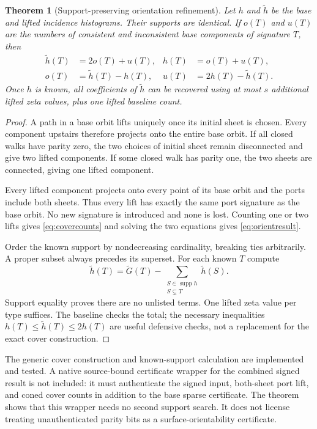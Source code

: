 \documentclass[11pt]{article}
\newtheorem{theorem}{Theorem}[section]
\theoremstyle{definition}
\newcommand{\supp}{\operatorname{supp}}
\begin{document}
\begin{theorem}[Support-preserving orientation refinement]
\label{thm:orientation}
Let $h$ and $\widetilde h$ be the base and lifted incidence histograms.
Their supports are identical. If $o(T)$ and $u(T)$ are the numbers of
consistent and inconsistent base components of signature $T$, then
\begin{align}
 \widetilde h(T)&=2o(T)+u(T),&h(T)&=o(T)+u(T),\label{eq:covercounts}\\
 o(T)&=\widetilde h(T)-h(T),&u(T)&=2h(T)-\widetilde h(T).\label{eq:orientresult}
\end{align}
Once $h$ is known, all coefficients of $\widetilde h$ can be recovered using
at most $s$ additional lifted zeta values, plus one lifted baseline count.
\end{theorem}
\begin{proof}
A path in a base orbit lifts uniquely once its initial sheet is chosen.
Every component upstairs therefore projects onto the entire base orbit.
If all closed walks have parity zero, the two choices of initial sheet
remain disconnected and give two lifted components. If some closed walk
has parity one, the two sheets are connected, giving one lifted component.

Every lifted component projects onto every point of its base orbit and the
ports include both sheets. Thus every lift has exactly the same port
signature as the base orbit. No new signature is introduced and none is
lost. Counting one or two lifts gives \eqref{eq:covercounts} and solving
the two equations gives \eqref{eq:orientresult}.

Order the known support by nondecreasing cardinality, breaking ties
arbitrarily. A proper subset always precedes its superset. For each known
$T$ compute
\begin{equation}
 \widetilde h(T)=\widetilde G(T)
 -\sum_{\substack{S\in\supp h\\S\subsetneq T}}\widetilde h(S).
 \label{eq:triangular-cover}
\end{equation}
Support equality proves there are no unlisted terms. One lifted zeta value
per type suffices. The baseline checks the total; the necessary inequalities
$h(T)\leq\widetilde h(T)\leq2h(T)$ are useful defensive checks, not a
replacement for the exact cover construction.
\end{proof}

The generic cover construction and known-support calculation are implemented
and tested. A native source-bound certificate wrapper for the combined
signed result is not included: it must authenticate the signed input,
both-sheet port lift, and coned cover counts in addition to the base sparse
certificate. The theorem shows that this wrapper needs no second support
search. It does not license treating unauthenticated parity bits as a
surface-orientability certificate.
\end{document}
